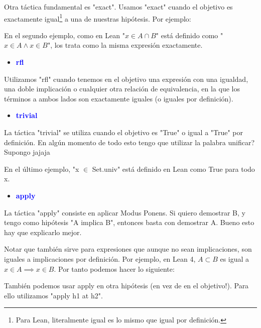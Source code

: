 \documentclass{article}
\begin{document}
Otra táctica fundamental es "exact". Usamos "exact" cuando el objetivo es exactamente igual\footnote{Para Lean, literalmente igual es lo mismo que igual por definición.} a una de nuestras hipótesis. Por ejemplo:


En el segundo ejemplo, como en Lean "$x \in A \cap B$" está definido como "$x \in A \land x \in B$", los trata como la misma expresión exactamente.

\begin{itemize}
  \item \textbf{\textcolor{blue}{rfl}}
\end{itemize}

Utilizamos "rfl" cuando tenemos en el objetivo una expresión con una igualdad, una doble implicación o cualquier otra relación de equivalencia, en la que los términos a ambos lados son exactamente iguales (o iguales por definición).


\begin{itemize}
  \item \textbf{\textcolor{blue}{trivial}}
\end{itemize}

La táctica "trivial" se utiliza cuando el objetivo es "True" o igual a "True" por definición. En algún momento de todo esto tengo que utilizar la palabra unificar? Supongo jajaja


En el último ejemplo, "x $\in$ Set.univ" está definido en Lean como True para todo x.

\begin{itemize}
  \item \textbf{\textcolor{blue}{apply}}
\end{itemize}

La táctica "apply" consiste en aplicar Modus Ponens. Si quiero demostrar B, y tengo como hipótesis "A implica B", entonces basta con demostrar A. Bueno esto hay que explicarlo mejor.

Notar que también sirve para expresiones que aunque no sean implicaciones, son iguales a implicaciones por definición. Por ejemplo, en Lean 4, $A \subset B$ es igual a $x \in A \implies x \in B$. Por tanto podemos hacer lo siguiente:


También podemos usar apply en otra hipótesis (en vez de en el objetivo!). Para ello utilizamos "apply h1 at h2".
\end{document}
